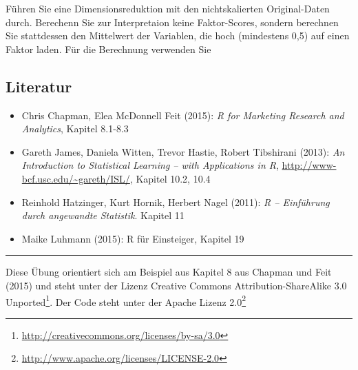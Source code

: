 \documentclass[12pt,]{book}
\makeatletter
\newenvironment{Shaded}{\begin{snugshade}}{\end{snugshade}}
\newcommand{\KeywordTok}[1]{\textcolor[rgb]{0.13,0.29,0.53}{\textbf{{#1}}}}
\newcommand{\DataTypeTok}[1]{\textcolor[rgb]{0.13,0.29,0.53}{{#1}}}
\newcommand{\DecValTok}[1]{\textcolor[rgb]{0.00,0.00,0.81}{{#1}}}
\newcommand{\StringTok}[1]{\textcolor[rgb]{0.31,0.60,0.02}{{#1}}}
\newcommand{\OtherTok}[1]{\textcolor[rgb]{0.56,0.35,0.01}{{#1}}}
\newcommand{\NormalTok}[1]{{#1}}
\providecommand{\tightlist}{%
  \setlength{\itemsep}{0pt}\setlength{\parskip}{0pt}}
\renewcommand{\href}[2]{#2\footnote{\url{#1}}}
\newenvironment{kframe}{%
\medskip{}
\setlength{\fboxsep}{.8em}
 \def\at@end@of@kframe{}%
 \ifinner\ifhmode%
  \def\at@end@of@kframe{\end{minipage}}%
  \begin{minipage}{\columnwidth}%
 \fi\fi%
 \def\FrameCommand##1{\hskip\@totalleftmargin \hskip-\fboxsep
 \colorbox{shadecolor}{##1}\hskip-\fboxsep
     \hskip-\linewidth \hskip-\@totalleftmargin \hskip\columnwidth}%
 \MakeFramed {\advance\hsize-\width
   \@totalleftmargin\z@ \linewidth\hsize
   \@setminipage}}%
 {\par\unskip\endMakeFramed%
 \at@end@of@kframe}
\renewenvironment{Shaded}{\begin{kframe}}{\end{kframe}}
\makeatother
\begin{document}
Führen Sie eine Dimensionsreduktion mit den nichtskalierten
Original-Daten durch. Berechenn Sie zur Interpretaion keine
Faktor-Scores, sondern berechnen Sie stattdessen den Mittelwert der
Variablen, die hoch (mindestens 0,5) auf einen Faktor laden. Für die
Berechnung verwenden Sie

\begin{Shaded}
\end{Shaded}

\subsection{Literatur}\label{literatur-4}

\begin{itemize}
\tightlist
\item
  Chris Chapman, Elea McDonnell Feit (2015): \emph{R for Marketing
  Research and Analytics}, Kapitel 8.1-8.3
\item
  Gareth James, Daniela Witten, Trevor Hastie, Robert Tibshirani (2013):
  \emph{An Introduction to Statistical Learning -- with Applications in
  R}, \url{http://www-bcf.usc.edu/~gareth/ISL/}, Kapitel 10.2, 10.4
\item
  Reinhold Hatzinger, Kurt Hornik, Herbert Nagel (2011): \emph{R --
  Einführung durch angewandte Statistik}. Kapitel 11
\item
  Maike Luhmann (2015): R für Einsteiger, Kapitel 19
\end{itemize}

\begin{center}\rule{0.5\linewidth}{\linethickness}\end{center}

Diese Übung orientiert sich am Beispiel aus Kapitel 8 aus Chapman und
Feit (2015) und steht unter der Lizenz
\href{http://creativecommons.org/licenses/by-sa/3.0}{Creative Commons
Attribution-ShareAlike 3.0 Unported}. Der Code steht unter der
\href{http://www.apache.org/licenses/LICENSE-2.0}{Apache Lizenz 2.0}
\end{document}
